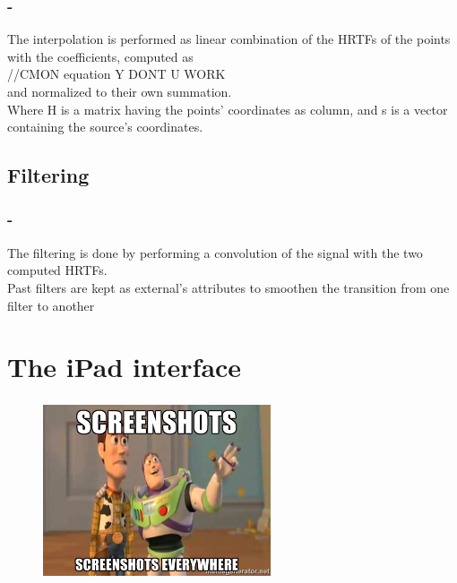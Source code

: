 \documentclass{beamer}
\begin{document}
	\begin{frame}
		\frametitle{\insertsection - \insertsubsection}
		The interpolation is performed as linear combination of the HRTFs of the points with the coefficients, computed as
		\\//CMON equation Y DONT U WORK\\
		and normalized to their own summation.\\
		Where H is a matrix having the points' coordinates as column, and s is a vector containing the source's
		coordinates.\\
	\end{frame}
	
	\subsection{Filtering}

	\begin{frame}
		\frametitle{\insertsection - \insertsubsection}
		The filtering is done by performing a convolution of the signal with the two computed HRTFs.\\
		Past filters are kept as external's attributes to smoothen the transition from one filter to another\\
	\end{frame}

	\section{The iPad interface}

	\begin{frame}
		\frametitle{\insertsection}
		\begin{figure}
			\centering
			  \includegraphics[width=0.6\textwidth]{images/marine.jpg}
		\end{figure}
	\end{frame}

	\begin{frame}
		\frametitle{\insertsection}
	\end{frame}

	\begin{frame}
		\frametitle{\insertsection}
	\end{frame}
\end{document}
